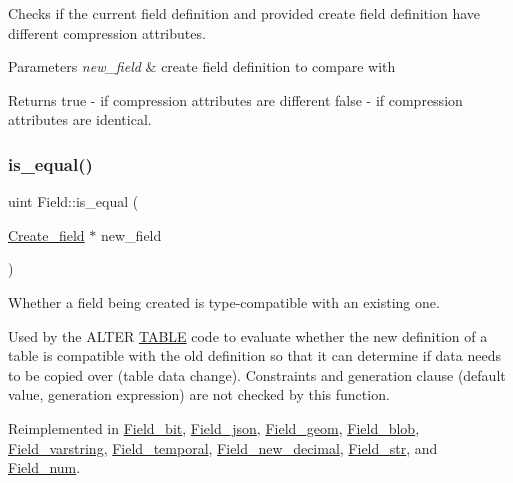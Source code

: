 Checks if the current field definition and provided create field definition have different compression attributes.


\begin{DoxyParams}{Parameters}
{\em new\+\_\+field} & create field definition to compare with\\
\hline
\end{DoxyParams}
\begin{DoxyReturn}{Returns}
true -\/ if compression attributes are different false -\/ if compression attributes are identical. 
\end{DoxyReturn}
\mbox{\label{classField_a8c99e9c66c1d578a339ae87d128843b7}} 
\subsubsection{\texorpdfstring{is\+\_\+equal()}{is\_equal()}}
{\footnotesize\ttfamily uint Field\+::is\+\_\+equal (\begin{DoxyParamCaption}\item[{\mbox{\hyperlink{classCreate__field}{Create\+\_\+field}} $\ast$}]{new\+\_\+field }\end{DoxyParamCaption})\hspace{0.3cm}{\ttfamily [virtual]}}

Whether a field being created is type-\/compatible with an existing one.

Used by the A\+L\+T\+ER \mbox{\hyperlink{structTABLE}{T\+A\+B\+LE}} code to evaluate whether the new definition of a table is compatible with the old definition so that it can determine if data needs to be copied over (table data change). Constraints and generation clause (default value, generation expression) are not checked by this function. 

Reimplemented in \mbox{\hyperlink{classField__bit_a92ecc819aaa815e8bd059db03c17d680}{Field\+\_\+bit}}, \mbox{\hyperlink{classField__json_a12d3ba38a6c987f627dce55780947578}{Field\+\_\+json}}, \mbox{\hyperlink{classField__geom_a20953b29b4a85e8d77f16593313fd381}{Field\+\_\+geom}}, \mbox{\hyperlink{classField__blob_aad2a7c5fe21d9c7cfd20aeea52c58ed5}{Field\+\_\+blob}}, \mbox{\hyperlink{classField__varstring_aa0bfc217f9c90b2cc741cdec8b97dd5c}{Field\+\_\+varstring}}, \mbox{\hyperlink{classField__temporal_ad9e7766bb91a905a5d81cc1b30d73cfb}{Field\+\_\+temporal}}, \mbox{\hyperlink{classField__new__decimal_a322bc9ecdcf1ffab0787b933fac016d9}{Field\+\_\+new\+\_\+decimal}}, \mbox{\hyperlink{classField__str_a281f4c166dbbfd070c6038c8b6f1595a}{Field\+\_\+str}}, and \mbox{\hyperlink{classField__num_af9c9a23de2d14eceaeb96f1f98212ed4}{Field\+\_\+num}}.

